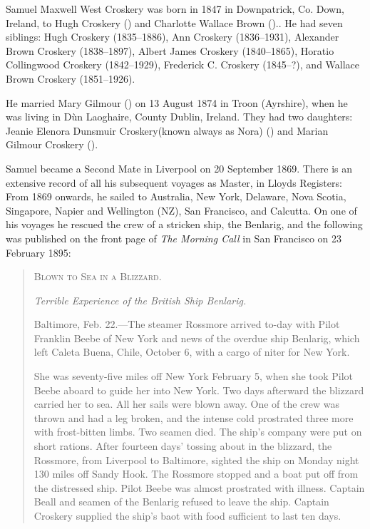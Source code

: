 
Samuel Maxwell West Croskery was born in 1847 in Downpatrick, Co. Down, Ireland, to Hugh Croskery () and Charlotte Wallace Brown ().\cite{SMWC-MG-marriage}. He had seven siblings: Hugh Croskery (1835--1886), Ann Croskery (1836--1931), Alexander Brown Croskery (1838--1897), Albert James Croskery (1840--1865), Horatio Collingwood Croskery (1842--1929), Frederick C. Croskery (1845--?), and Wallace Brown Croskery (1851--1926).

He married Mary Gilmour () on 13 August 1874 in Troon (Ayrshire), when he was living in D\`{u}n Laoghaire, County Dublin, Ireland.\cite{SMWC-MG-marriage} They had two daughters: Jeanie Elenora Dunsmuir Croskery(known always as Nora) () and Marian Gilmour Croskery ().

Samuel became a Second Mate in Liverpool on 20 September 1869. There is an extensive record of all his subsequent voyages as Master, in Lloyds Registers:\cite{MarineRecordsSMWC} From 1869 onwards, he sailed to Australia, New York, Delaware, Nova Scotia, Singapore, Napier and Wellington (NZ), San Francisco, and Calcutta. On one of his voyages he rescued the crew of a stricken ship, the Benlarig, and the following was published on the front page of \emph{The Morning Call} in San Francisco on 23 February 1895:

\begin{quotation}
\textsc{Blown to Sea in a Blizzard.}

\emph{Terrible Experience of the British Ship Benlarig.}

Baltimore, Feb. 22.---The steamer Rossmore arrived to-day with Pilot Franklin Beebe of New York and news of the overdue ship Benlarig, which left Caleta Buena, Chile, October 6, with a cargo of niter for New York.

She was seventy-five miles off New York February 5, when she took Pilot Beebe aboard to guide her into New York. Two days afterward the blizzard carried her to sea. All her sails were blown away. One of the crew was thrown and had a leg broken, and the intense cold prostrated three more with frost-bitten limbs. Two seamen died. The ship's company were put on short rations. After fourteen days' tossing about in the blizzard, the Rossmore, from Liverpool to Baltimore, sighted the ship on Monday night 130 miles off Sandy Hook. The Rossmore stopped and a boat put off from the distressed ship. Pilot Beebe was almost prostrated with illness. Captain Beall and seamen of the Benlarig refused to leave the ship. Captain Croskery supplied the ship's baot with food sufficient to last ten days. 
\end{quotation}


